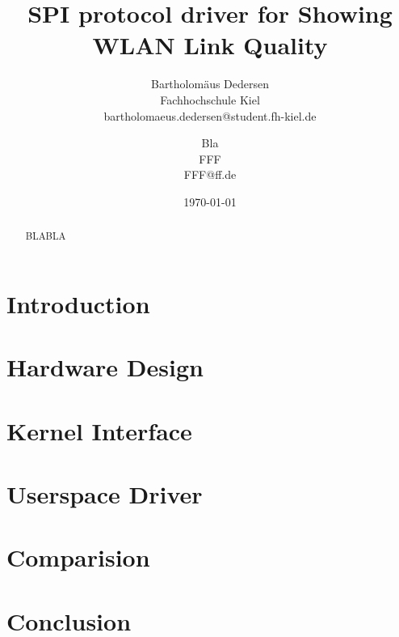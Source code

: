 \documentclass[bibtotocnumbered, headsepline,normalheadings]{report}
\begin{document}
\author{ 
Bartholomäus Dedersen \\ Fachhochschule Kiel \\ bartholomaeus.dedersen@student.fh-kiel.de \and
Bla \\ FFF \\ FFF@ff.de}

\date{\today} 
\title{SPI protocol driver for Showing WLAN Link Quality} 

\maketitle


\begin{abstract}

    BLABLA

\end{abstract}

\tableofcontents \newpage

\chapter{Introduction}



\chapter{Hardware Design}
\label{chap:hardware}



\chapter{Kernel Interface}
\label{chap:kernel}


\chapter{Userspace Driver}
\label{chap:userspace}


\chapter{Comparision}
\label{chap:comperision}


\chapter{Conclusion}
\label{chap:conclusion}



\nocite{*}


\listoffigures
\begingroup \let\clearpage\relax
\listoftables \endgroup

\end{document}
